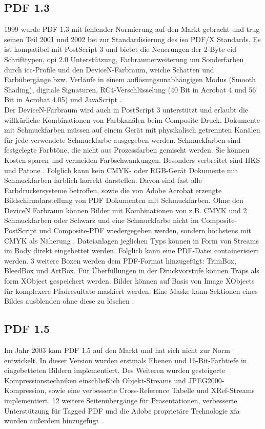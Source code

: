 \subsection{PDF 1.3}
1999 wurde PDF 1.3 mit fehlender Normierung auf den Markt gebracht und trug seinen Teil 2001 und 2002 bei zur Standardisierung des \gls{iso} PDF/X Standards. Es ist kompatibel mit PostScript 3 und bietet die Neuerungen der 2-Byte \gls{cid} Schrifttypen, \gls{opi} 2.0 Unterstützung, Farbraumerweiterung um Sonderfarben durch \gls{icc}-Profile und den DeviceN-Farbraum, weiche Schatten und Farbübergänge bzw. Verläufe in einem auflösungsunabhängigen Modus (Smooth Shading), digitale Signaturen, RC4-Verschlüsselung (40 Bit in Acrobat 4 und 56 Bit in Acrobat 4.05) und JavaScript \cite{proj-consult, schneeberger}. \\ 
Der DeviceN-Farbraum wird auch in PostScript 3 unterstützt und erlaubt die willkürliche Kombinationen von Farbkanälen beim Composite-Druck. Dokumente mit Schmuckfarben müssen auf einem Gerät mit physikalisch getrennten Kanälen für jede verwendete Schmuckfarbe ausgegeben werden. Schmuckfarben sind festgelegte Farbtöne, die nicht aus Prozessfarben gemischt werden. Sie können Kosten sparen und vermeiden Farbschwankungen. Besonders verbreitet sind HKS und Patone \cite{kompendium}. Folglich kann kein CMYK- oder RGB-Gerät Dokumente mit Schmuckfarben farblich korrekt darstellen. Davon sind fast alle Farbdruckersysteme betroffen, sowie die von Adobe Acrobat erzeugte Bildschirmdarstellung von PDF Dokumenten mit Schmuckfarben. Ohne den DeviceN Farbraum können Bilder mit Kombinationen von z.B. CMYK und 2 Schmuckfarben oder Schwarz und eine Schmuckfarbe nicht im Composite-PostScript und Composite-PDF wiedergegeben werden, sondern höchstens mit CMYK als Näherung \cite{helios}. 
Dateianlagen jeglichen Typs können in Form von Streams im Body direkt eingebettet werden. Folglich kann eine PDF-Datei containerisiert werden. 3 weitere Boxen werden dem PDF-Format hinzugefügt: TrimBox, BleedBox und ArtBox. Für Überfüllungen in der Druckvorstufe können Traps als form XObject gespeichert werden. Bilder können auf Basis von Image XObjects für komplexere Pfadresultate maskiert werden. Eine Maske kann Sektionen eines Bildes ausblenden ohne diese zu löschen \cite{schneeberger}.


\subsection{PDF 1.5}
Im Jahr 2003 kam PDF 1.5 auf den Markt und hat sich nicht zur Norm entwickelt. In dieser Version wurden erstmals Ebenen und 16-Bit-Farbtiefe in eingebetteten Bildern implementiert. Des Weiteren wurden gesteigerte Kompressionstechniken einschließlich Objekt-Streams und JPEG2000-Kompression, sowie eine verbesserte Cross-Reference Tabelle und XRef-Streams implementiert. 12 weitere Seitenübergänge für Präsentationen, verbesserte Unterstützung für Tagged PDF und die Adobe proprietäre Technologie \gls{xfa} wurden außerdem hinzugefügt \cite{proj-consult, schneeberger}. 

